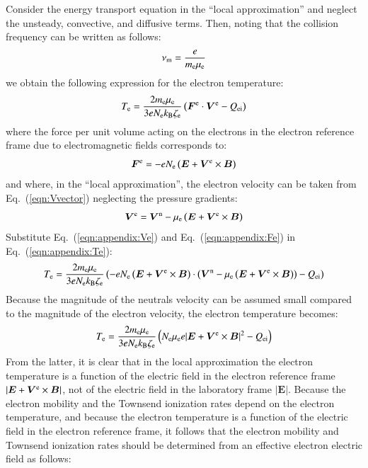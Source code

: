 \documentclass[twoside,onecolumn,10pt]{waflarticle}
\renewcommand{\vec}[1]{\bm{#1}}
\renewcommand{\vec}[1]{\bm{ #1 }}
\begin{document}
Consider the energy transport equation in the ``local approximation'' and neglect the unsteady, convective, and diffusive terms. Then, noting that the collision frequency can be written as follows:
%
\begin{equation}
\nu_{\rm m}=\frac{e}{m_{\rm e}\mu_{\rm e}}
\end{equation}
%
we obtain the following expression for the electron temperature:
%
\begin{equation}
  T_{\rm e}  
=  
 \frac{2 m_{\rm e} \mu_{\rm e}}{3 e N_{\rm e} k_{\rm B} \zeta_{\rm e} }
\left(  \vec{F}^{\rm e}\cdot \vec{V}^{\rm e}
 - Q_{\rm ei}\right)
\label{eqn:appendix:Te}
 \end{equation}
%
where the force per unit volume acting on the electrons in the electron reference frame due to electromagnetic fields  corresponds to:
%
\begin{equation}
\vec{F}^{\rm e} = -eN_{\rm e}\left(\vec{E} + \vec{V}^{\rm e} \times \vec{B}\right)
\label{eqn:appendix:Fe}
\end{equation}
%
and where, in the ``local approximation'',  the electron velocity can be taken from Eq.\ (\ref{eqn:Vvector}) neglecting the pressure gradients:
%
\begin{equation}
  \vec{V}^{\rm e}=\vec{V}^{\rm n} - \mu_{\rm e} \left(\vec{E}+\vec{V}^{\rm e} \times \vec{B}\right)
\label{eqn:appendix:Ve}
\end{equation}
% 
Substitute Eq.\ (\ref{eqn:appendix:Ve}) and Eq.\ (\ref{eqn:appendix:Fe}) in Eq.\ (\ref{eqn:appendix:Te}):
%
\begin{equation}
  T_{\rm e}  
=  
 \frac{2 m_{\rm e} \mu_{\rm e}}{3 e N_{\rm e} k_{\rm B} \zeta_{\rm e} }
\left( -e N_{\rm e} \left(\vec{E} + \vec{V}^{\rm e} \times \vec{B}\right)\cdot \left(\vec{V}^{\rm n} - \mu_{\rm e} \left(\vec{E}+\vec{V}^{\rm e} \times \vec{B}\right)\right)
 - Q_{\rm ei}\right)
 \end{equation}
%
Because the magnitude of the neutrals velocity can be assumed small compared to the magnitude of the electron velocity, the electron temperature becomes:
%
\begin{equation}
  T_{\rm e}  
=  
 \frac{2 m_{\rm e} \mu_{\rm e}}{3 e N_{\rm e} k_{\rm B} \zeta_{\rm e} }
\left(  N_{\rm e} \mu_{\rm e} e |\vec{E}+\vec{V}^{\rm e}\times \vec{B}|^2
 - Q_{\rm ei}\right)
 \end{equation}
%
From the latter, it is clear that in the local approximation the electron temperature is a function of the electric field in the electron reference frame $|\vec{E}+\vec{V}^{\rm e}\times \vec{B}|$, not of the electric field in the laboratory frame $|\vec{E}|$. Because the electron mobility and the Townsend ionization rates depend on the electron temperature, and because the electron temperature is a function of the electric field in the electron reference frame, it follows that the electron mobility and Townsend ionization rates should be determined from an effective electron electric field as follows: 
\end{document}
